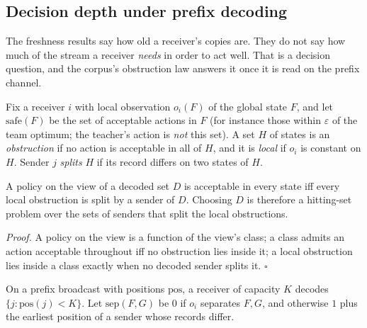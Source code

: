 
\subsection{Decision depth under prefix decoding}\label{sec:depth}
The freshness results say how old a receiver's copies are. They do not say how much of the stream a receiver
\emph{needs} in order to act well. That is a decision question, and the corpus's obstruction law answers it once it is
read on the prefix channel.

Fix a receiver $i$ with local observation $o_i(F)$ of the global state $F$, and let $\mathrm{safe}(F)$ be the set of
acceptable actions in $F$ (for instance those within $\varepsilon$ of the team optimum; the teacher's action is
\emph{not} this set). A set $H$ of states is an \emph{obstruction} if no action is acceptable in all of $H$, and it is
\emph{local} if $o_i$ is constant on $H$. Sender $j$ \emph{splits} $H$ if its record differs on two states of $H$.

\begin{claim}\label{cl:hit}
A policy on the view of a decoded set $D$ is acceptable in every state iff every local obstruction is split by a sender
of $D$. Choosing $D$ is therefore a hitting-set problem over the sets of senders that split the local obstructions.
\end{claim}
\emph{Proof.} A policy on the view is a function of the view's class; a class admits an action acceptable throughout iff
no obstruction lies inside it; a local obstruction lies inside a class exactly when no decoded sender splits it.
$\square$

On a prefix broadcast with positions $\mathrm{pos}$, a receiver of capacity $K$ decodes $\{j:\mathrm{pos}(j)<K\}$. Let
$\mathrm{sep}(F,G)$ be $0$ if $o_i$ separates $F,G$, and otherwise $1$ plus the earliest position of a sender whose records
differ.

